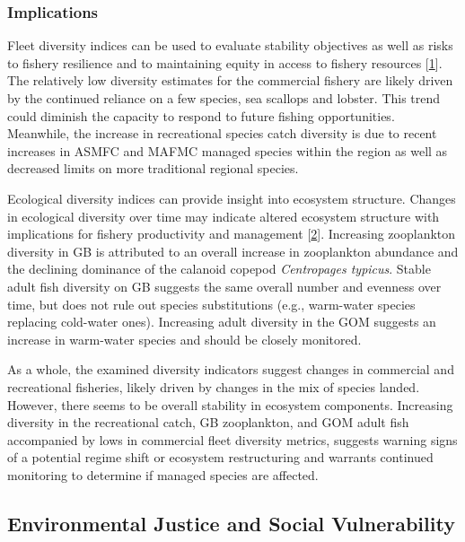 \documentclass[
  10pt,
]{article}
\begin{document}
\hypertarget{implications-3}{%
\subsubsection{Implications}\label{implications-3}}

Fleet diversity indices can be used to evaluate stability objectives as well as risks to fishery resilience and to maintaining equity in access to fishery resources {[}\protect\hyperlink{ref-gaichas_implementing_2018}{1}{]}. The relatively low diversity estimates for the commercial fishery are likely driven by the continued reliance on a few species, sea scallops and lobster. This trend could diminish the capacity to respond to future fishing opportunities. Meanwhile, the increase in recreational species catch diversity is due to recent increases in ASMFC and MAFMC managed species within the region as well as decreased limits on more traditional regional species.

Ecological diversity indices can provide insight into ecosystem structure. Changes in ecological diversity over time may indicate altered ecosystem structure with implications for fishery productivity and management {[}\protect\hyperlink{ref-friedland_changes_2020}{2}{]}. Increasing zooplankton diversity in GB is attributed to an overall increase in zooplankton abundance and the declining dominance of the calanoid copepod \emph{Centropages typicus}. Stable adult fish diversity on GB suggests the same overall number and evenness over time, but does not rule out species substitutions (e.g., warm-water species replacing cold-water ones). Increasing adult diversity in the GOM suggests an increase in warm-water species and should be closely monitored.

As a whole, the examined diversity indicators suggest changes in commercial and recreational fisheries, likely driven by changes in the mix of species landed. However, there seems to be overall stability in ecosystem components. Increasing diversity in the recreational catch, GB zooplankton, and GOM adult fish accompanied by lows in commercial fleet diversity metrics, suggests warning signs of a potential regime shift or ecosystem restructuring and warrants continued monitoring to determine if managed species are affected.

\hypertarget{environmental-justice-and-social-vulnerability}{%
\subsection{Environmental Justice and Social Vulnerability}\label{environmental-justice-and-social-vulnerability}}
\end{document}

